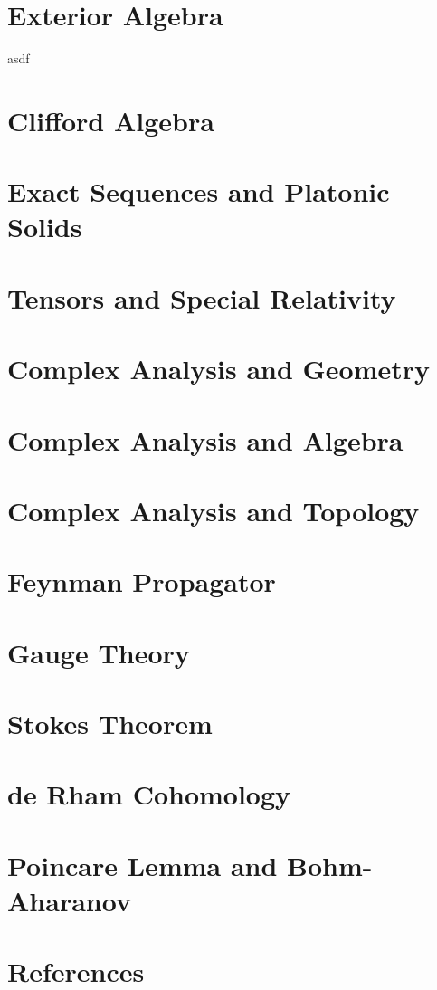 \documentclass[12pt]{article}
\theoremstyle{definition}
\theoremstyle{remark}
\theoremstyle{example}
\begin{document}
\section{Exterior Algebra}

asdf

\section{Clifford Algebra}

\section{Exact Sequences and Platonic Solids}

\section{Tensors and Special Relativity}

\section{Complex Analysis and Geometry}

\section{Complex Analysis and Algebra}

\section{Complex Analysis and Topology}

\section{Feynman Propagator}

\section{Gauge Theory}

\section{Stokes Theorem}

\section{de Rham Cohomology}

\section{Poincare Lemma and Bohm-Aharanov}

\section{References}
\end{document}
